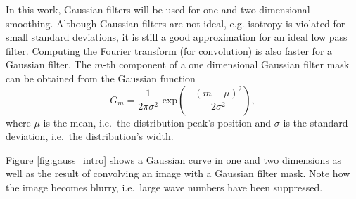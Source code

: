 		In this work, Gaussian filters will be used for one and two dimensional smoothing. Although Gaussian filters are not ideal, e.g. isotropy is violated for small standard deviations, it is still a good approximation for an ideal low pass filter. Computing the Fourier transform (for convolution) is also faster for a Gaussian filter. The $m$-th component of a one dimensional Gaussian filter mask can be obtained from the Gaussian function
		\begin{equation}
		G_{m} = \dfrac{1}{2 \pi \sigma^2} \text{ exp}
			 \left( 
			 	- \dfrac{(m-\mu)^2}{2 \sigma^2}
			 \right),
		\end{equation}
		where $\mu$ is the mean, i.e.\ the distribution peak's position and $\sigma$ is the standard deviation, i.e.\ the distribution's width.
		
		Figure \ref{fig:gauss_intro} shows a Gaussian curve in one and two dimensions as well as the result of convolving an image with a Gaussian filter mask. Note how the image becomes blurry, i.e.\ large wave numbers have been suppressed.
